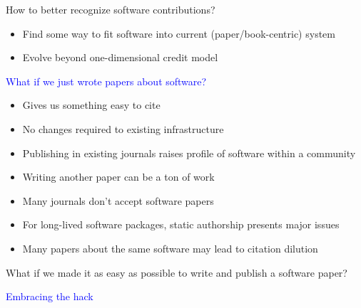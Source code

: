 \begin{frame}{How to better recognize software
contributions?}

\begin{itemize}
    \item Find some way to fit software into
current (paper/book-centric)
system
    \item  Evolve beyond one-dimensional
credit model
\end{itemize}

\begin{center}
    \textcolor{blue}{What if we just wrote papers about software?}
\end{center}

\begin{itemize}
    \item<only@1> Gives us something easy to cite 
    \item<only@1> No changes required to existing
infrastructure 
    \item<only@1> Publishing in existing journals raises
profile of software within a community 
%
    \item<2> Writing another paper can be a ton of
work 
    \item<2> Many journals don’t accept software
papers 
    \item<2> For long-lived software packages, static
authorship presents major issues 
    \item<2> Many papers about the same software
may lead to citation dilution 
\end{itemize}

    
\end{frame}

\begin{frame}

\begin{center}
What if we made it as easy as
possible to write and publish a
software paper?
\end{center}

\begin{center}
   \textcolor{blue}{Embracing the hack}
\end{center}

\end{frame}

